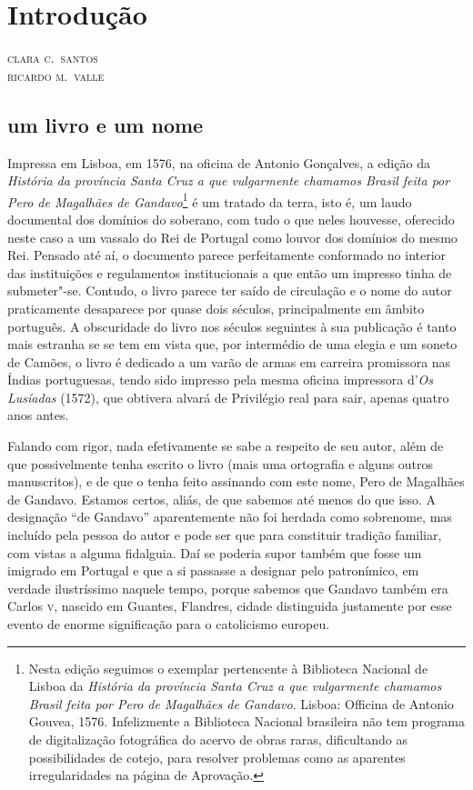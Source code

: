 
\chapter[Introdução, \emph{por Clara C.~Santos e Ricardo M.~Valle}]{Introdução}

\begin{flushright}
\textsc{clara c.~santos\\ricardo m.~valle}
\end{flushright}

\section{um livro e um nome}

Impressa em Lisboa, em 1576, na oficina de Antonio Gonçalves, a edição
da \textit{História da província Santa Cruz a que vulgarmente chamamos Brasil
feita por Pero de Magalhães de Gandavo}\footnote{ Nesta edição
seguimos o exemplar pertencente à Biblioteca Nacional de Lisboa da
\textit{História da província Santa Cruz a que vulgarmente chamamos Brasil
feita por Pero de Magalhães de Gandavo}. Lisboa: Officina de Antonio
Gouvea, 1576. Infelizmente a Biblioteca Nacional brasileira não tem
programa de digitalização fotográfica do acervo de obras raras,
dificultando as possibilidades de cotejo, para resolver problemas como
as aparentes irregularidades na página de Aprovação.} é um tratado da terra, isto
é, um laudo documental dos domínios do soberano, com tudo o que neles
houvesse, oferecido neste caso a um vassalo do Rei de Portugal como
louvor dos domínios do mesmo Rei. Pensado até aí, o documento parece
perfeitamente conformado no interior das instituições e regulamentos
institucionais a que então um impresso tinha de submeter"-se. Contudo, o
livro parece ter saído de circulação e o nome do autor praticamente
desaparece por quase dois séculos, principalmente em âmbito português.
A obscuridade do livro nos séculos seguintes à sua publicação é tanto
mais estranha se se tem em vista que, por intermédio de uma elegia e um
soneto de Camões, o livro é dedicado a um varão de armas em carreira
promissora nas Índias portuguesas, tendo sido impresso pela mesma
oficina impressora d'\textit{Os Lusíadas} (1572), que obtivera
alvará de Privilégio real para sair, apenas quatro anos antes.

Falando com rigor, nada efetivamente se sabe a respeito de seu autor,
além de que possivelmente tenha escrito o livro (mais uma ortografia e
alguns outros manuscritos), e de que o tenha feito assinando com este
nome, Pero de Magalhães de Gandavo. Estamos certos, aliás, de que
sabemos até menos do que isso. A designação ``de Gandavo'' 
aparentemente não foi herdada como sobrenome, mas incluído pela pessoa 
do autor e pode ser que para constituir tradição familiar, com vistas a alguma 
fidalguia. Daí se poderia supor também que fosse um imigrado em Portugal 
e que a si passasse a designar pelo patronímico, em verdade ilustríssimo naquele tempo, 
porque sabemos que Gandavo também era Carlos \textsc{v}, nascido em Guantes, 
Flandres, cidade distinguida justamente por esse evento de enorme 
significação para o catolicismo europeu.

